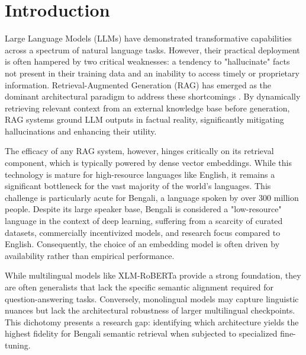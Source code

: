 \documentclass[manuscript,screen,review]{acmart}
\begin{document}


\maketitle

\section{Introduction}

Large Language Models (LLMs) have demonstrated transformative capabilities across a spectrum of natural language tasks. However, their practical deployment is often hampered by two critical weaknesses: a tendency to "hallucinate" facts not present in their training data and an inability to access timely or proprietary information. Retrieval-Augmented Generation (RAG) has emerged as the dominant architectural paradigm to address these shortcomings \cite{lewis2020retrieval, gao2023survey}. By dynamically retrieving relevant context from an external knowledge base before generation, RAG systems ground LLM outputs in factual reality, significantly mitigating hallucinations and enhancing their utility.

The efficacy of any RAG system, however, hinges critically on its retrieval component, which is typically powered by dense vector embeddings. While this technology is mature for high-resource languages like English, it remains a significant bottleneck for the vast majority of the world's languages. This challenge is particularly acute for Bengali, a language spoken by over 300 million people. Despite its large speaker base, Bengali is considered a "low-resource" language in the context of deep learning, suffering from a scarcity of curated datasets, commercially incentivized models, and research focus compared to English. Consequently, the choice of an embedding model is often driven by availability rather than empirical performance.

While multilingual models like XLM-RoBERTa \cite{conneau2019unsupervised} provide a strong foundation, they are often generalists that lack the specific semantic alignment required for question-answering tasks. Conversely, monolingual models may capture linguistic nuances but lack the architectural robustness of larger multilingual checkpoints. This dichotomy presents a research gap: identifying which architecture yields the highest fidelity for Bengali semantic retrieval when subjected to specialized fine-tuning.
\end{document}
